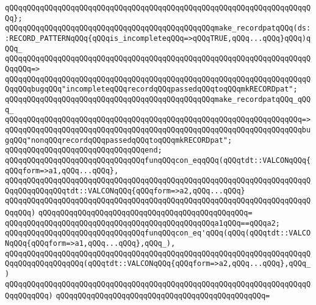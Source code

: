 \verb|qQQqqQQqqQQqqQQqqQQqqQQqqQQqqQQqqQQqqQQqqQQqqQQqqQQqqQQqqQQqqQQqqQQqqQQq};|\newline
\newline
\verb|qQQqqQQqqQQqqQQqqQQqqQQqqQQqqQQqqQQqqQQqqQQqqQQqmake_recordpatqQQq(ds::RECORD_PATTERNqQQq{qQQqis_incompleteqQQq=>qQQqTRUE,qQQq...qQQq}qQQq)qQQq_|\newline
\verb|qQQqqQQqqQQqqQQqqQQqqQQqqQQqqQQqqQQqqQQqqQQqqQQqqQQqqQQqqQQqqQQqqQQqqQQqqQQq=>|\newline
\verb|qQQqqQQqqQQqqQQqqQQqqQQqqQQqqQQqqQQqqQQqqQQqqQQqqQQqqQQqqQQqqQQqqQQqqQQqqQQqbugqQQq"incompleteqQQqrecordqQQqpassedqQQqtoqQQqmkRECORDpat";|\newline
\newline
\verb|qQQqqQQqqQQqqQQqqQQqqQQqqQQqqQQqqQQqqQQqqQQqqQQqmake_recordpatqQQq_qQQq_|\newline
\verb|qQQqqQQqqQQqqQQqqQQqqQQqqQQqqQQqqQQqqQQqqQQqqQQqqQQqqQQqqQQqqQQqqQQq=>|\newline
\verb|qQQqqQQqqQQqqQQqqQQqqQQqqQQqqQQqqQQqqQQqqQQqqQQqqQQqqQQqqQQqqQQqqQQqbugqQQq"nonqQQqrecordqQQqpassedqQQqtoqQQqmkRECORDpat";|\newline
\verb|qQQqqQQqqQQqqQQqqQQqqQQqqQQqqQQqend;|\newline
\newline
\verb|qQQqqQQqqQQqqQQqqQQqqQQqqQQqqQQqfunqQQqcon_eqqQQq(qQQqtdt::VALCONqQQq{qQQqform=>a1,qQQq...qQQq},|\newline
\verb|qQQqqQQqqQQqqQQqqQQqqQQqqQQqqQQqqQQqqQQqqQQqqQQqqQQqqQQqqQQqqQQqqQQqqQQqqQQqqQQqqQQqtdt::VALCONqQQq{qQQqform=>a2,qQQq...qQQq}|\newline
\verb|qQQqqQQqqQQqqQQqqQQqqQQqqQQqqQQqqQQqqQQqqQQqqQQqqQQqqQQqqQQqqQQqqQQqqQQqqQQq)|\newline
\verb|qQQqqQQqqQQqqQQqqQQqqQQqqQQqqQQqqQQqqQQqqQQqqQQq=|\newline
\verb|qQQqqQQqqQQqqQQqqQQqqQQqqQQqqQQqqQQqqQQqqQQqqQQqa1qQQq==qQQqa2;|\newline
\newline
\verb|qQQqqQQqqQQqqQQqqQQqqQQqqQQqqQQqfunqQQqcon_eq'qQQq(qQQq(qQQqtdt::VALCONqQQq{qQQqform=>a1,qQQq...qQQq},qQQq_),|\newline
\verb|qQQqqQQqqQQqqQQqqQQqqQQqqQQqqQQqqQQqqQQqqQQqqQQqqQQqqQQqqQQqqQQqqQQqqQQqqQQqqQQqqQQqqQQq(qQQqtdt::VALCONqQQq{qQQqform=>a2,qQQq...qQQq},qQQq_)|\newline
\verb|qQQqqQQqqQQqqQQqqQQqqQQqqQQqqQQqqQQqqQQqqQQqqQQqqQQqqQQqqQQqqQQqqQQqqQQqqQQqqQQq)|\newline
\verb|qQQqqQQqqQQqqQQqqQQqqQQqqQQqqQQqqQQqqQQqqQQqqQQq=|\newline
